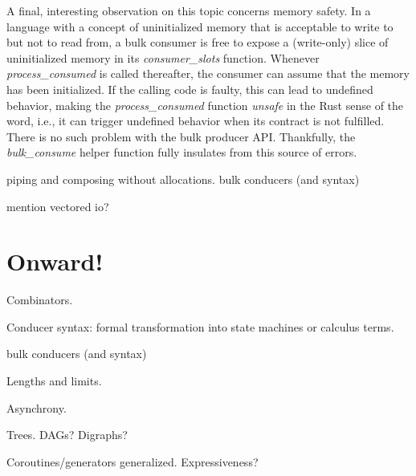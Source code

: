\documentclass[sigplan,screen,10pt,anonymous,review]{acmart}
\begin{document}
A final, interesting observation on this topic concerns memory safety. In a language with a concept of uninitialized memory that is acceptable to write to but not to read from, a bulk consumer is free to expose a (write-only) slice of uninitialized memory in its \textit{consumer\_slots} function. Whenever \textit{process\_consumed} is called thereafter, the consumer can assume that the memory has been initialized. If the calling code is faulty, this can lead to undefined behavior, making the \textit{process\_consumed} function \textit{unsafe} in the Rust sense of the word, i.e., it can trigger undefined behavior when its contract is not fulfilled. There is no such problem with the bulk producer API. Thankfully, the \textit{bulk\_consume} helper function fully insulates from this source of errors.





piping and composing without allocations. bulk conducers (and syntax)




mention vectored io?



\section{Onward!}\label{fun}

Combinators.

Conducer syntax: formal transformation into state machines or calculus terms.

bulk conducers (and syntax)

Lengths and limits.

Asynchrony.

Trees. DAGs? Digraphs?

Coroutines/generators generalized. Expressiveness?
\end{document}
